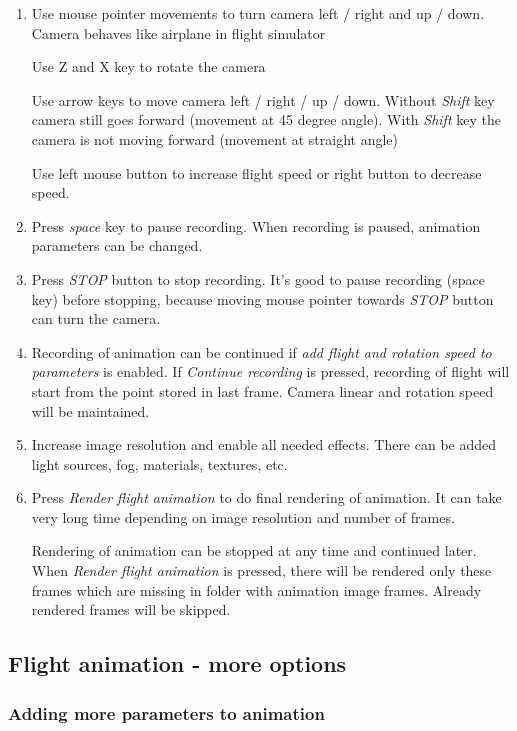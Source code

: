 \begin{enumerate}
	\item Use mouse pointer movements to turn camera left / right and up / down. Camera behaves like airplane in flight simulator
	
	Use Z and X key to rotate the camera
	
	Use arrow keys to move camera left / right / up / down. Without \emph{Shift} key camera still goes forward (movement at 45 degree angle). With \emph{Shift} key the camera is not moving forward (movement at straight angle)
	
	Use left mouse button to increase flight speed or right button to decrease speed.
	
	\item Press \emph{space} key to pause recording. When recording is paused, animation parameters can be changed. 
	
	\item Press \emph{STOP} button to stop recording. It's good to pause recording (space key) before stopping, because moving mouse pointer towards \emph{STOP} button can turn the camera.
	
	\item Recording of animation can be continued if \emph{add flight and rotation speed to parameters} is enabled. If \emph{Continue recording} is pressed, recording of flight will start from the point stored in last frame. Camera linear and rotation speed will be maintained.
	
	\item Increase image resolution and enable all needed effects. There can be added light sources, fog, materials, textures, etc.
	
	\item Press \emph{Render flight animation} to do final rendering of animation. It can take very long time depending on image resolution and number of frames.
	
	Rendering of animation can be stopped at any time and continued later. When \emph{Render flight animation} is pressed, there will be rendered only these frames which are missing in folder with animation image frames. Already rendered frames will be skipped.
	
\end{enumerate}
	
	\subsection{Flight animation - more options}
	
	\subsubsection{Adding more parameters to animation}
	
